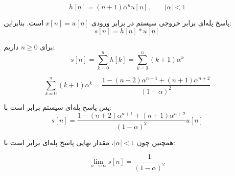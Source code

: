 \[
h[n] = (n+1)\alpha^n u[n], \qquad |\alpha| < 1
\]

پاسخ پله‌ای برابر خروجی سیستم در برابر ورودی \(x[n]=u[n]\) است. بنابراین:
\[
s[n] = h[n] * u[n]
\]

 برای \(n \ge 0\) داریم:
\[
s[n] = \sum_{k=0}^{n} h[k]
     = \sum_{k=0}^{n} (k+1)\alpha^k
\]

\[
\sum_{k=0}^{n} (k+1)\alpha^k
=
\frac{1-(n+2)\alpha^{n+1}+(n+1)\alpha^{n+2}}{(1-\alpha)^2}
\]

پس پاسخ پله‌ای سیستم برابر است با:
\[
\boxed{
s[n] =
\frac{1-(n+2)\alpha^{n+1}+(n+1)\alpha^{n+2}}{(1-\alpha)^2}u[n]
}
\]

همچنین چون \(|\alpha|<1\)، مقدار نهایی پاسخ پله‌ای برابر است با:

\[
    \boxed{
        \lim_{n\to\infty}s[n] = \frac{1}{(1-\alpha)^2}
        }
\]
